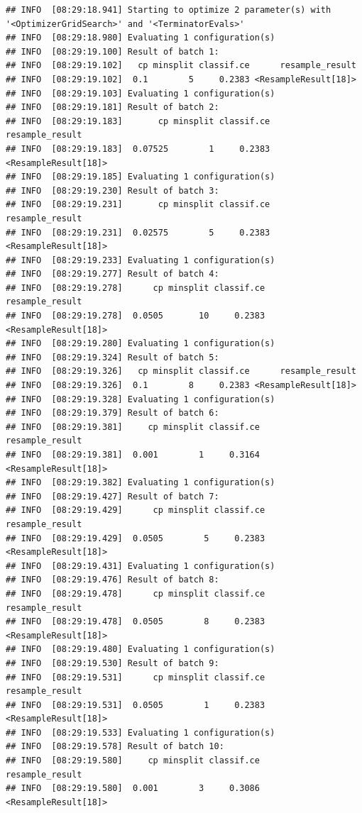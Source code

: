 \documentclass[]{scrbook}
\begin{document}
\begin{verbatim}
## INFO  [08:29:18.941] Starting to optimize 2 parameter(s) with '<OptimizerGridSearch>' and '<TerminatorEvals>' 
## INFO  [08:29:18.980] Evaluating 1 configuration(s) 
## INFO  [08:29:19.100] Result of batch 1: 
## INFO  [08:29:19.102]   cp minsplit classif.ce      resample_result 
## INFO  [08:29:19.102]  0.1        5     0.2383 <ResampleResult[18]> 
## INFO  [08:29:19.103] Evaluating 1 configuration(s) 
## INFO  [08:29:19.181] Result of batch 2: 
## INFO  [08:29:19.183]       cp minsplit classif.ce      resample_result 
## INFO  [08:29:19.183]  0.07525        1     0.2383 <ResampleResult[18]> 
## INFO  [08:29:19.185] Evaluating 1 configuration(s) 
## INFO  [08:29:19.230] Result of batch 3: 
## INFO  [08:29:19.231]       cp minsplit classif.ce      resample_result 
## INFO  [08:29:19.231]  0.02575        5     0.2383 <ResampleResult[18]> 
## INFO  [08:29:19.233] Evaluating 1 configuration(s) 
## INFO  [08:29:19.277] Result of batch 4: 
## INFO  [08:29:19.278]      cp minsplit classif.ce      resample_result 
## INFO  [08:29:19.278]  0.0505       10     0.2383 <ResampleResult[18]> 
## INFO  [08:29:19.280] Evaluating 1 configuration(s) 
## INFO  [08:29:19.324] Result of batch 5: 
## INFO  [08:29:19.326]   cp minsplit classif.ce      resample_result 
## INFO  [08:29:19.326]  0.1        8     0.2383 <ResampleResult[18]> 
## INFO  [08:29:19.328] Evaluating 1 configuration(s) 
## INFO  [08:29:19.379] Result of batch 6: 
## INFO  [08:29:19.381]     cp minsplit classif.ce      resample_result 
## INFO  [08:29:19.381]  0.001        1     0.3164 <ResampleResult[18]> 
## INFO  [08:29:19.382] Evaluating 1 configuration(s) 
## INFO  [08:29:19.427] Result of batch 7: 
## INFO  [08:29:19.429]      cp minsplit classif.ce      resample_result 
## INFO  [08:29:19.429]  0.0505        5     0.2383 <ResampleResult[18]> 
## INFO  [08:29:19.431] Evaluating 1 configuration(s) 
## INFO  [08:29:19.476] Result of batch 8: 
## INFO  [08:29:19.478]      cp minsplit classif.ce      resample_result 
## INFO  [08:29:19.478]  0.0505        8     0.2383 <ResampleResult[18]> 
## INFO  [08:29:19.480] Evaluating 1 configuration(s) 
## INFO  [08:29:19.530] Result of batch 9: 
## INFO  [08:29:19.531]      cp minsplit classif.ce      resample_result 
## INFO  [08:29:19.531]  0.0505        1     0.2383 <ResampleResult[18]> 
## INFO  [08:29:19.533] Evaluating 1 configuration(s) 
## INFO  [08:29:19.578] Result of batch 10: 
## INFO  [08:29:19.580]     cp minsplit classif.ce      resample_result 
## INFO  [08:29:19.580]  0.001        3     0.3086 <ResampleResult[18]> 

\end{verbatim}
\end{document}
